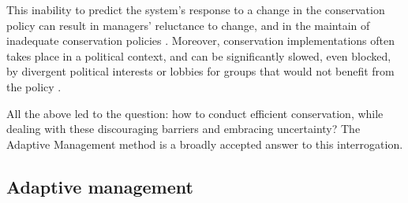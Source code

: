 \documentclass[12pt,a4paper]{article}
\begin{document}
This inability to predict the system's response to a change in the conservation policy can result in managers' reluctance to change, and in the maintain of inadequate conservation policies \citep{peterson2005conservation, keith2011uncertainty}.
Moreover, conservation implementations often takes place in a political context, and can be significantly slowed, even blocked, by divergent political interests or lobbies for groups that would not benefit from the policy \citep{keith2011uncertainty}.

All the above led to the question: how to conduct efficient conservation, while dealing with these discouraging barriers and embracing uncertainty?
The Adaptive Management method is a broadly accepted answer to this interrogation.

\subsection{Adaptive management}
%
\end{document}
